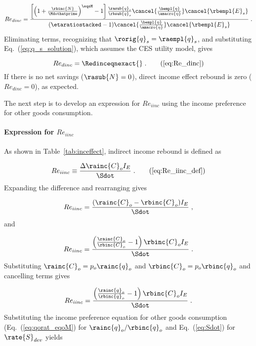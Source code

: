 \begin{equation}
  Re_{dinc} = \frac{\left[ \left( 1 + \frac{\rbinc{N}}{\Mdothatprime} \right) ^{\eqsM} - 1  \right] 
                  \frac{\rasub{q}_s}{\rbsub{q}_s}
                \cancel{\frac{\bempl{\eta}}{\amacro{\eta}}}
                \cancel{\rbempl{E}_s}}
              {\left( \etaratiostacked - 1 \right)\! 
                  \cancel{\frac{\bempl{\eta}}{\amacro{\eta}}} \cancel{\rbempl{E}_s}} \; .
\end{equation}
%
Eliminating terms, recognizing that 
$\rorig{q}_s = \raempl{q}_s$, and substituting Eq.~(\ref{eq:q_s_solution}), 
which assumes the CES utility model,
gives

\begin{equation} 
  Re_{dinc} = \Redinceqnexact{} \; . \tag{\ref{eq:Re_dinc}}
\end{equation}
%
If there is no net savings ($\rasub{N} = 0$), 
direct income effect rebound is zero ($Re_{dinc} = 0$), as expected.

The next step is to develop an expression for $Re_{iinc}$
using the income preference for other goods consumption.


\paragraph{Expression for $Re_{iinc}$}
\label{sec:Re_iinc}

As shown in Table~\ref{tab:inceffect}, indirect income rebound is defined as

\begin{equation}
  Re_{iinc} \equiv \frac{\Delta \rainc{C}_o I_E}{\Sdot} \; . \tag{\ref{eq:Re_iinc_def}}
\end{equation}
%
Expanding the difference and rearranging gives

\begin{equation}
  Re_{iinc} = \frac{(\rainc{C}_o - \rbinc{C}_o) I_E}{\Sdot} \; , 
\end{equation}
%
and

\begin{equation}
  Re_{iinc} = \frac{\left( \frac{\rainc{C}_o}{\rbinc{C}_o} - 1  \right) \rbinc{C}_o I_E}{\Sdot} \; .
\end{equation}
%
Substituting $\rainc{C}_o = p_o \rainc{q}_o$ and $\rbinc{C}_o = p_o \rbinc{q}_o$ and
cancelling terms gives

\begin{equation}
  Re_{iinc} = \frac{\left( \frac{\rainc{q}_o}{\rbinc{q}_o} - 1  \right) \rbinc{C}_o I_E}{\Sdot} \; .
\end{equation}
%
Substituting the income preference equation for other goods consumption (Eq.~(\ref{eq:qorat_eqoM}) 
for $\rainc{q}_o / \rbinc{q}_o$
and Eq.~(\ref{eq:Sdot}) for $\rate{S}_{dev}$ yields

